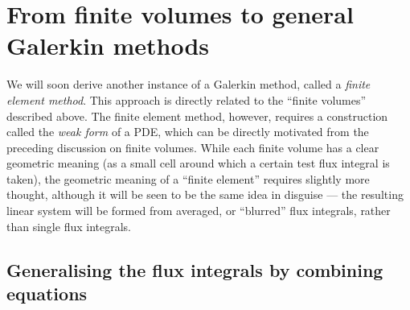 
\section{From finite volumes to general Galerkin methods}
We will soon derive another instance of a Galerkin method, called a \textit{finite element method}.
This approach is directly related to the ``finite volumes'' described above. 
The finite element method, however, requires a construction called the \textit{weak form} of a PDE,
which can be directly motivated from the preceding discussion on finite volumes.
While each finite volume
has a clear geometric meaning (as a small cell around which a certain test flux integral is taken), the geometric meaning of a ``finite element''
requires slightly more thought, although it will be seen to be the same idea in disguise --- the resulting linear system
will be formed from averaged, or ``blurred'' flux integrals, rather than single flux integrals.

\subsection{Generalising the flux integrals by combining equations}

